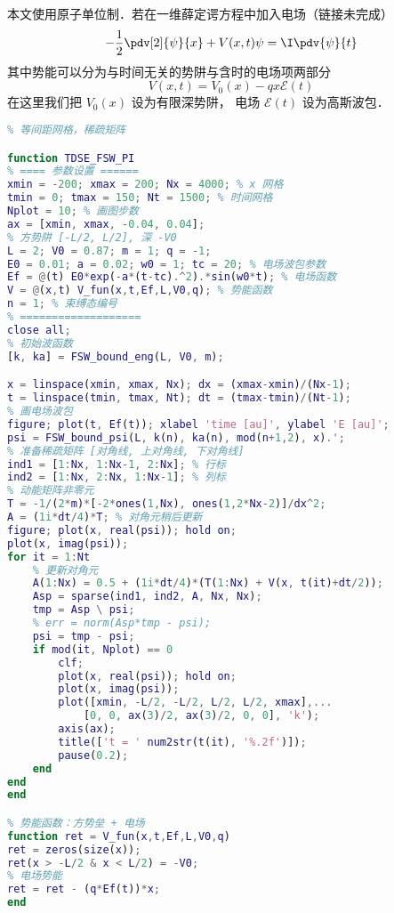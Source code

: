 
\begin{issues}
\issueDraft
\end{issues}


本文使用原子单位制．若在一维薛定谔方程中加入电场（链接未完成）
\begin{equation}
-\frac12 \pdv[2]{\psi}{x} + V(x,t)\psi = \I \pdv{\psi}{t}
\end{equation}
其中势能可以分为与时间无关的势阱与含时的电场项两部分
\begin{equation}
V(x,t) = V_0(x) - qx\mathcal E(t)
\end{equation}
在这里我们把 $V_0(x)$ 设为有限深势阱， 电场 $\mathcal E(t)$ 设为高斯波包．

\begin{lstlisting}[language=matlab]
% 一维有限深方势阱中的光电离模拟
% 等间距网格，稀疏矩阵

function TDSE_FSW_PI
% ==== 参数设置 ======
xmin = -200; xmax = 200; Nx = 4000; % x 网格
tmin = 0; tmax = 150; Nt = 1500; % 时间网格
Nplot = 10; % 画图步数
ax = [xmin, xmax, -0.04, 0.04];
% 方势阱 [-L/2, L/2], 深 -V0
L = 2; V0 = 0.87; m = 1; q = -1;
E0 = 0.01; a = 0.02; w0 = 1; tc = 20; % 电场波包参数
Ef = @(t) E0*exp(-a*(t-tc).^2).*sin(w0*t); % 电场函数
V = @(x,t) V_fun(x,t,Ef,L,V0,q); % 势能函数
n = 1; % 束缚态编号
% ===================
close all;
% 初始波函数
[k, ka] = FSW_bound_eng(L, V0, m);

x = linspace(xmin, xmax, Nx); dx = (xmax-xmin)/(Nx-1);
t = linspace(tmin, tmax, Nt); dt = (tmax-tmin)/(Nt-1);
% 画电场波包
figure; plot(t, Ef(t)); xlabel 'time [au]', ylabel 'E [au]';
psi = FSW_bound_psi(L, k(n), ka(n), mod(n+1,2), x).';
% 准备稀疏矩阵 [对角线, 上对角线, 下对角线]
ind1 = [1:Nx, 1:Nx-1, 2:Nx]; % 行标
ind2 = [1:Nx, 2:Nx, 1:Nx-1]; % 列标
% 动能矩阵非零元
T = -1/(2*m)*[-2*ones(1,Nx), ones(1,2*Nx-2)]/dx^2;
A = (1i*dt/4)*T; % 对角元稍后更新
figure; plot(x, real(psi)); hold on;
plot(x, imag(psi));
for it = 1:Nt
    % 更新对角元
    A(1:Nx) = 0.5 + (1i*dt/4)*(T(1:Nx) + V(x, t(it)+dt/2));
    Asp = sparse(ind1, ind2, A, Nx, Nx);
    tmp = Asp \ psi;
    % err = norm(Asp*tmp - psi);
    psi = tmp - psi;
    if mod(it, Nplot) == 0
        clf;
        plot(x, real(psi)); hold on;
        plot(x, imag(psi));
        plot([xmin, -L/2, -L/2, L/2, L/2, xmax],...
            [0, 0, ax(3)/2, ax(3)/2, 0, 0], 'k');
        axis(ax);
        title(['t = ' num2str(t(it), '%.2f')]);
        pause(0.2);
    end
end
end

% 势能函数：方势垒 + 电场
function ret = V_fun(x,t,Ef,L,V0,q)
ret = zeros(size(x));
ret(x > -L/2 & x < L/2) = -V0;
% 电场势能
ret = ret - (q*Ef(t))*x;
end
\end{lstlisting}
